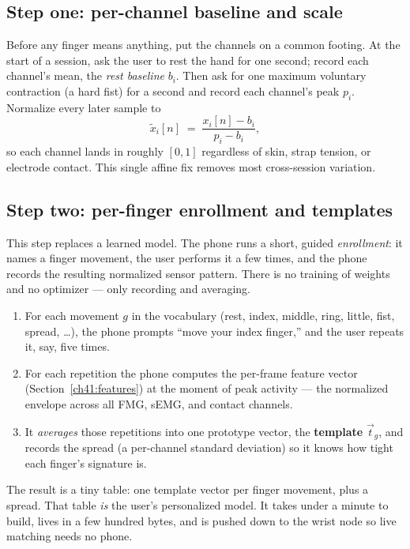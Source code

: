 \subsection{Step one: per-channel baseline and scale}

Before any finger means anything, put the channels on a common footing. At the
start of a session, ask the user to rest the hand for one second; record each
channel's mean, the \emph{rest baseline} $b_i$. Then ask for one maximum
voluntary contraction (a hard fist) for a second and record each channel's peak
$p_i$. Normalize every later sample to
\[
  \tilde{x}_i[n] \;=\; \frac{x_i[n] - b_i}{p_i - b_i},
\]
so each channel lands in roughly $[0,1]$ regardless of skin, strap tension, or
electrode contact. This single affine fix removes most cross-session variation.

\subsection{Step two: per-finger enrollment and templates}
\label{ch41:enroll}

This step replaces a learned model. The phone runs a short, guided
\emph{enrollment}: it names a finger movement, the user performs it a few times,
and the phone records the resulting normalized sensor pattern. There is no
training of weights and no optimizer --- only recording and averaging.

\begin{enumerate}
  \item For each movement $g$ in the vocabulary (rest, index, middle, ring,
        little, fist, spread, \ldots), the phone prompts ``move your index
        finger,'' and the user repeats it, say, five times.
  \item For each repetition the phone computes the per-frame feature vector
        (Section~\ref{ch41:features}) at the moment of peak activity --- the
        normalized envelope across all FMG, sEMG, and contact channels.
  \item It \emph{averages} those repetitions into one prototype vector, the
        \textbf{template} $\vec{t}_g$, and records the spread (a per-channel
        standard deviation) so it knows how tight each finger's signature is.
\end{enumerate}

The result is a tiny table: one template vector per finger movement, plus a
spread. That table \emph{is} the user's personalized model. It takes under a
minute to build, lives in a few hundred bytes, and is pushed down to the wrist
node so live matching needs no phone.

